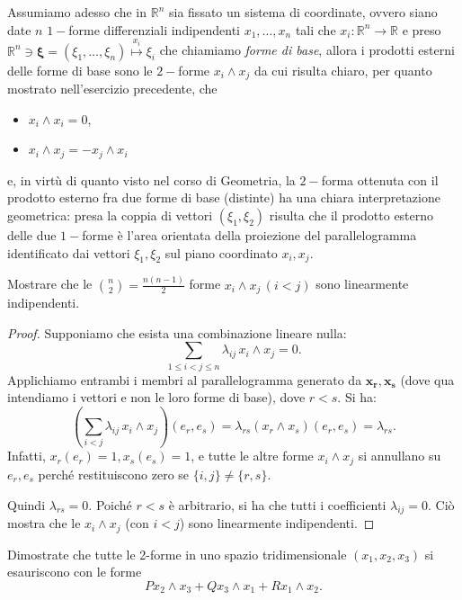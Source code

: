 Assumiamo adesso che in $\mathbb{R}^n$ sia fissato un sistema di coordinate, ovvero siano date $n$ $1-$forme differenziali indipendenti $x_1, \ldots, x_n$ tali che $x_i: \mathbb{R}^n \to \mathbb{R}$ e preso $\mathbb{R}^n \ni \mathbf{\xi} = (\xi_1, \ldots, \xi_n) \stackrel{x_i}{\mapsto} \xi_i$ che chiamiamo \emph{forme di base}, allora i prodotti esterni delle forme di base sono le $2-$forme $x_i \wedge x_j$ da cui risulta chiaro, per quanto mostrato nell'esercizio precedente, che
\begin{itemize}
    \item $x_i \wedge x_i = 0$,
    \item $x_i \wedge x_j = - x_j \wedge x_i$
\end{itemize}
e, in virtù di quanto visto nel corso di Geometria, la $2-$forma ottenuta con il prodotto esterno fra due forme di base (distinte) ha una chiara interpretazione geometrica: presa la coppia di vettori $(\xi_1, \xi_2)$ risulta che il prodotto esterno delle due $1-$forme è l'area orientata della proiezione del parallelogramma identificato dai vettori $\xi_1, \xi_2$ sul piano coordinato $x_i, x_j$.
\begin{exercise}
    Mostrare che le $\binom{n}{2} = \frac{n(n-1)}{2}$ forme $x_i \wedge x_j \, (i < j)$ sono linearmente indipendenti.
\end{exercise}
\begin{proof}
    Supponiamo che esista una combinazione lineare nulla:
    \[
        \sum_{1 \le i < j \le n} \lambda_{ij} \, x_i \wedge x_j = 0.
    \]
    Applichiamo entrambi i membri al parallelogramma generato da \( \mathbf{x_r}, \mathbf{x_s} \) (dove qua intendiamo i vettori e non le loro forme di base), dove \( r < s \). Si ha:
    \[
        \left( \sum_{i < j} \lambda_{ij} \, x_i \wedge x_j \right)(e_r, e_s) = \lambda_{rs} (x_r \wedge x_s)(e_r, e_s) = \lambda_{rs}.
    \]
    Infatti, \( x_r(e_r) = 1, x_s(e_s) = 1 \), e tutte le altre forme \( x_i \wedge x_j \) si annullano su \( e_r, e_s \) perché restituiscono zero se \( \{i,j\} \ne \{r,s\} \).

    Quindi \( \lambda_{rs} = 0 \). Poiché \( r < s \) è arbitrario, si ha che tutti i coefficienti \( \lambda_{ij} = 0 \). Ciò mostra che le \( x_i \wedge x_j \) (con \( i < j \)) sono linearmente indipendenti.
\end{proof}
\begin{exercise}
    Dimostrate che tutte le 2-forme in uno spazio tridimensionale $(x_1, x_2, x_3)$ si esauriscono con le forme
    $$
        P x_2 \wedge x_3 + Q x_3 \wedge x_1 + R x_1 \wedge x_2.
    $$
\end{exercise}
